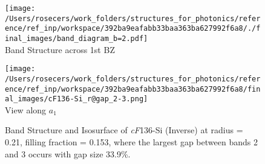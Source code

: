 \begin{figure}[H]
\begin{minipage}{0.5\textwidth}\centering
\texttt{[image: /Users/rosecers/work\_folders/structures\_for\_photonics/reference/ref\_inp/workspace/392ba9eafabb33baa363ba627992f6a8/./final\_images/band\_diagram\_b=2.pdf]}
\\Band Structure across 1st BZ
\end{minipage}\hfill
\begin{minipage}{0.48\textwidth}\centering
\texttt{[image: /Users/rosecers/work\_folders/structures\_for\_photonics/reference/ref\_inp/workspace/392ba9eafabb33baa363ba627992f6a8/final\_images/cF136-Si\_r@gap\_2-3.png]}
\\View along $a_1$ 
\end{minipage}\hfill\caption{Band Structure and Isosurface of \textit{cF}136-Si (Inverse) at radius = 0.21, filling fraction = 0.153, where the largest gap between bands 2 and 3 occurs with gap size 33.9\%.}

\end{figure}
\vspace{-0.25in}

